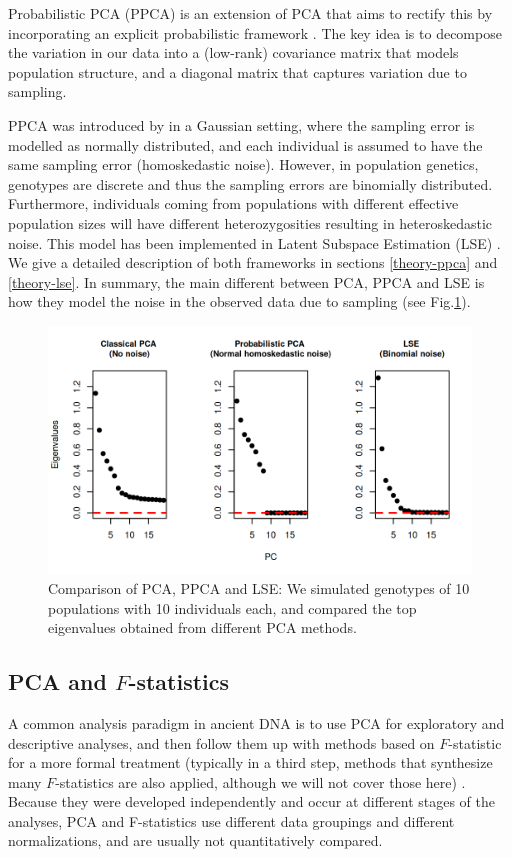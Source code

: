 \documentclass[12pt, letterpaper]{article}
\begin{document}
Probabilistic PCA (PPCA) is an extension of PCA that aims to rectify this by incorporating an explicit probabilistic framework \cite{tipping_probabilistic_1999-1}.  
The key idea is to decompose the variation in our data into a (low-rank) covariance matrix that models population structure, and a diagonal matrix that captures variation due to sampling.

PPCA was introduced by \cite{tipping_probabilistic_1999-1} in a Gaussian setting, where the sampling error is modelled as normally distributed, and each individual is assumed to have the same sampling error (homoskedastic noise). However, in population genetics, genotypes are discrete and thus the sampling errors are binomially distributed. Furthermore, individuals coming from populations with different effective population sizes will have different heterozygosities resulting in heteroskedastic noise. This model has been implemented in Latent Subspace Estimation (LSE) \cite{chen_consistent_2015, van_waaij_evaluation_2023, cabreros_likelihood-free_2019}. We give a detailed description of both frameworks in sections \ref{theory-ppca} and \ref{theory-lse}. In summary, the main different between PCA, PPCA and LSE is how they model the noise in the observed data due to sampling (see Fig.\ref{fig1:pca_ppca}). 

\begin{figure}[ht!]
    \includegraphics[width=16.5cm]{plots/pca_all_genetic.png}
    \centering
    \caption{Comparison of PCA, PPCA and LSE: We simulated genotypes of 10 populations with 10 individuals each, and compared the top eigenvalues obtained from different PCA methods.}
    \label{fig1:pca_ppca} 
\end{figure}

\subsection{PCA and $F$-statistics}
A common analysis paradigm in ancient DNA is to use PCA for exploratory and descriptive analyses, and then follow them up with methods based on $F$-statistic for a more formal treatment (typically in a third step, methods that synthesize many $F$-statistics are also applied, although we will not cover those here) \citep{orlando_ancient_2021}. Because they were developed independently and occur at different stages of the analyses, PCA and F-statistics use different data groupings and different normalizations, and are usually not quantitatively compared. 
\end{document}
